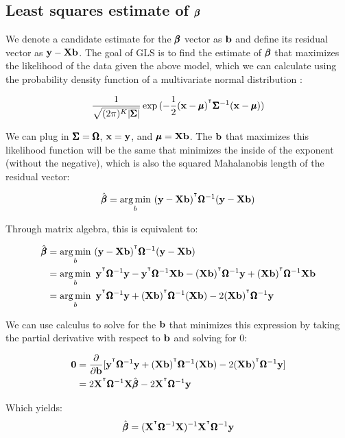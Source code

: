 \documentclass[12pt]{article}
\begin{document}
\subsection[Least squares estimate of beta]{Least squares estimate of $\pmb{\beta}$}

We denote a candidate estimate for the $\pmb{\beta}$ vector as $\mathbf{b}$ and define its residual vector as $ \mathbf{y} - \mathbf{X} \mathbf{b} $. The goal of GLS is to find the estimate of $\pmb{\beta}$ that maximizes the likelihood of the data given the above model, which we can calculate using the probability density function of a multivariate normal distribution \citep{wikipedia2026webMVN}:

$$
\frac{1}{\sqrt{(2 \pi)^K |\pmb{\Sigma}| }}
\exp{(-\frac{1}{2}(\mathbf{x}- \pmb{\mu})^{^\intercal} \pmb{\Sigma}^{-1} (\mathbf{x}- \pmb{\mu}))}
$$

We can plug in $\pmb{\Sigma} = \pmb{\Omega}$, $\mathbf{x} = \mathbf{y}$, and $\pmb{\mu} = \mathbf{X} \mathbf{b}$. The $\mathbf{b}$ that maximizes this likelihood function will be the same that minimizes the inside of the exponent (without the negative), which is also the squared Mahalanobis length of the residual vector:

$$ \hat{\pmb{\beta}} = \operatorname*{arg\,min}_b ~ (\mathbf{y} - \mathbf{X} \mathbf{b})^{^\intercal} \pmb{\Omega}^{-1} (\mathbf{y} - \mathbf{X} \mathbf{b}) $$

Through matrix algebra, this is equivalent to:

\begin{align*}
    \hat{\pmb{\beta}} &= \operatorname*{arg\,min}_b ~ (\mathbf{y} - \mathbf{X} \mathbf{b})^{^\intercal} \pmb{\Omega}^{-1} (\mathbf{y} - \mathbf{X} \mathbf{b}) \\
    &= \operatorname*{arg\,min}_b ~ \mathbf{y}^{^\intercal} \pmb{\Omega}^{-1} \mathbf{y} - \mathbf{y}^{^\intercal} \pmb{\Omega}^{-1} \mathbf{X} \mathbf{b} - (\mathbf{X} \mathbf{b})^{^\intercal} \pmb{\Omega}^{-1} \mathbf{y} + (\mathbf{X} \mathbf{b})^{^\intercal} \pmb{\Omega}^{-1} \mathbf{X} \mathbf{b} \\
    &= \operatorname*{arg\,min}_b ~ \mathbf{y}^{^\intercal} \pmb{\Omega}^{-1} \mathbf{y} + (\mathbf{X} \mathbf{b})^{^\intercal} \pmb{\Omega}^{-1} (\mathbf{X} \mathbf{b}) - 2(\mathbf{X} \mathbf{b})^{^\intercal} \pmb{\Omega}^{-1} \mathbf{y}
\end{align*}

We can use calculus to solve for the $\mathbf{b}$ that minimizes this expression by taking the partial derivative with respect to $\mathbf{b}$ and solving for 0:

\begin{align*}
    \textbf{0} &= \frac{\partial}{\partial \mathbf{b}} [ \mathbf{y}^{^\intercal} \pmb{\Omega}^{-1} \mathbf{y} + (\mathbf{X} \mathbf{b})^{^\intercal} \pmb{\Omega}^{-1} (\mathbf{X} \mathbf{b}) - 2(\mathbf{X} \mathbf{b})^{^\intercal} \pmb{\Omega}^{-1} \mathbf{y} ]\\
    &=  2 \mathbf{X}^{^\intercal} \pmb{\Omega}^{-1} \mathbf{X} \hat{\pmb{\beta}} - 2 \mathbf{X}^{^\intercal} \pmb{\Omega}^{-1} \mathbf{y}
\end{align*}

Which yields:
$$ \hat{\pmb{\beta}} = (\mathbf{X}^{^\intercal} \pmb{\Omega}^{-1} \mathbf{X})^{-1} \mathbf{X}^{^\intercal} \pmb{\Omega}^{-1} \mathbf{y} $$
\end{document}
